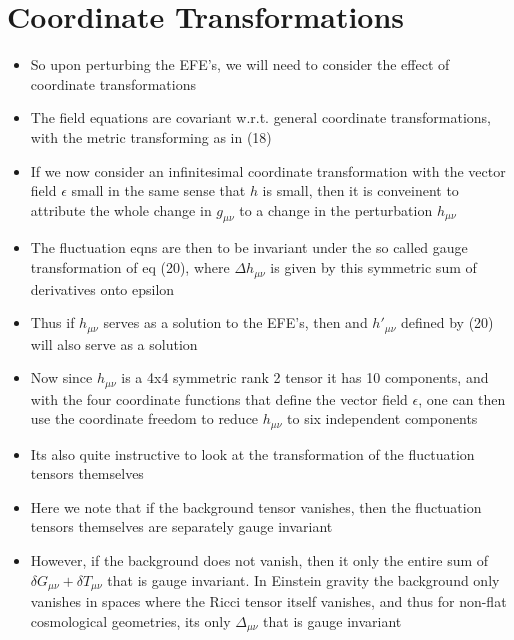 \documentclass[10pt,letterpaper]{article}
\numberwithin{equation}{section}
\begin{document}
\section{Coordinate Transformations}
\begin{itemize}	
	\item So upon perturbing the EFE's, we will need to consider the effect of coordinate transformations
	\item The field equations are covariant w.r.t. general coordinate transformations, with the metric transforming as in (18)
	\item If we now consider an infinitesimal coordinate transformation with the vector field $\epsilon$ small in the same sense that $h$ is small, then it is conveinent to attribute the whole change in $g_{\mu\nu}$ to a change in the perturbation $h_{\mu\nu}$ 
	\item The fluctuation eqns are then to be invariant under the so called gauge transformation of eq (20), where $\Delta h_{\mu\nu}$ is given by this symmetric sum of derivatives onto epsilon
	\item Thus if $h_{\mu\nu}$ serves as a solution to the EFE's, then and $h'_{\mu\nu}$ defined by (20) will also serve as a solution
	\item Now since $h_{\mu\nu}$ is a 4x4 symmetric rank 2 tensor it has 10 components, and with the four coordinate functions that define the vector field $\epsilon$, one can then use the coordinate freedom to reduce $h_{\mu\nu}$ to six independent components
	\item Its also quite instructive to look at the transformation of the fluctuation tensors themselves
	\item Here we note that if the background tensor vanishes, then the fluctuation tensors themselves are separately gauge invariant
	\item However, if the background does not vanish, then it only the entire sum of $\delta G_{\mu\nu} + \delta T_{\mu\nu}$ that is gauge invariant. In Einstein gravity the background only vanishes in spaces where the Ricci tensor itself vanishes, and thus for non-flat cosmological geometries, its only $\Delta_{\mu\nu}$ that is gauge invariant
\end{itemize}

\end{document}
